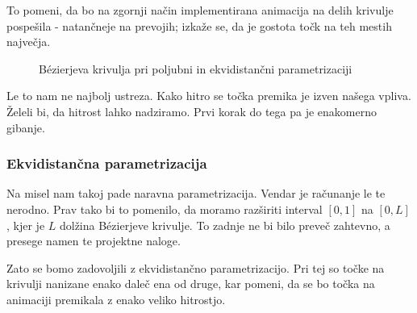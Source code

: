 \documentclass[a4paper,12pt]{article}
\begin{document}
	To pomeni, da bo na zgornji način implementirana animacija na delih krivulje pospešila - natančneje na prevojih; izkaže se, da je gostota točk na teh mestih največja.
	
	\begin{figure}[h]
		\hfil
		\caption{B\'ezierjeva krivulja pri poljubni in ekvidistančni parametrizaciji}
	\end{figure}
	
	Le to nam ne najbolj ustreza. Kako hitro se točka premika je izven našega vpliva. Želeli bi, da hitrost lahko nadziramo. Prvi korak do tega pa je enakomerno gibanje. 
	
	\subsubsection{Ekvidistančna parametrizacija}
	
	Na misel nam takoj pade naravna parametrizacija. Vendar je računanje le te nerodno. Prav tako bi to pomenilo, da moramo razširiti interval $[0,1]$ na $[0,L]$, kjer je $L$ dolžina B\'ezierjeve krivulje. To zadnje ne bi bilo preveč zahtevno, a presege namen te projektne naloge. 
	
	Zato se bomo zadovoljili z ekvidistančno parametrizacijo. Pri tej so točke na krivulji nanizane enako daleč ena od druge, kar pomeni, da se bo točka na animaciji premikala z enako veliko hitrostjo.
	
\end{document}
